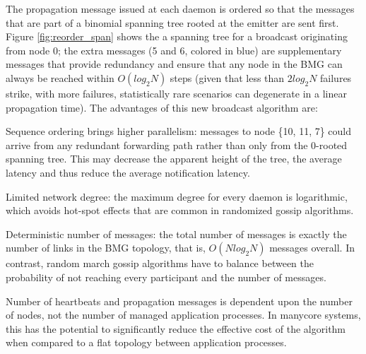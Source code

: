 \documentclass[sigconf]{acmart}
\begin{document}
The propagation message issued at each daemon is ordered so that the
messages that are part of a binomial spanning tree rooted at the emitter
are sent first. Figure \ref{fig:reorder_span} shows the a spanning tree
for a broadcast originating from node 0; the extra messages (5 and 6, colored
in blue) are supplementary messages that provide redundancy and ensure that
any node in the BMG can always be reached within $O(log_2 N)$ steps (given
that less than $2 log_2 N$ failures strike, with more failures,
statistically rare scenarios can degenerate in a linear propagation time).
The advantages of this new broadcast algorithm are:
\begin{compactenum}
  \item Sequence ordering brings higher parallelism: messages to node \{10, 11, 7\} could arrive from any redundant forwarding path rather than only from the 0-rooted spanning tree. This may decrease the apparent height of the tree, the average latency and thus reduce the average notification latency.
  \item Limited network degree: the maximum degree for every daemon is logarithmic, which avoids hot-spot effects that are common in randomized gossip algorithms.
  \item Deterministic number of messages: the total number of messages is
  exactly the number of links in the BMG topology, that is, $O(N log_2 N)$
  messages overall. In contrast, random march gossip algorithms have to
  balance between the probability of not reaching every participant and 
  the number of messages.
  \item Number of heartbeats and propagation messages is dependent upon
  the number of nodes, not the number of managed application processes.
  In manycore systems, this has the potential to significantly reduce the
  effective cost of the algorithm when compared to a flat topology between
  application processes.
\end{compactenum}
\end{document}
